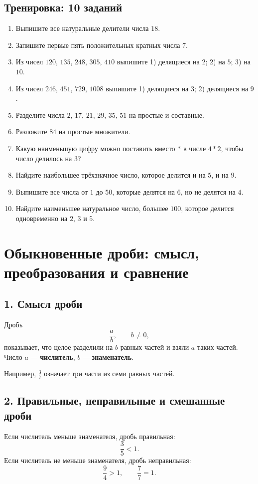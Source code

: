 \documentclass[12pt,a4paper]{article}
\newcommand{\term}[1]{\textbf{\textcolor{graphite}{#1}}}
\newcommand{\trainingtitle}{\subsection*{Тренировка: 10 заданий}}
\begin{document}
\trainingtitle
\begin{enumerate}
  \item Выпишите все натуральные делители числа $18$.
  \item Запишите первые пять положительных кратных числа $7$.
  \item Из чисел $120$, $135$, $248$, $305$, $410$ выпишите 1) делящиеся на $2$; 2) на $5$; 3) на $10$.
  \item Из чисел $246$, $451$, $729$, $1008$ выпишите 1) делящиеся на $3$; 2) делящиеся на $9$.
  \item Разделите числа $2$, $17$, $21$, $29$, $35$, $51$ на простые и составные.
  \item Разложите $84$ на простые множители.
  \item Какую наименьшую цифру можно поставить вместо $*$ в числе $4*2$, чтобы число делилось на $3$?
  \item Найдите наибольшее трёхзначное число, которое делится и на $5$, и на $9$.
  \item Выпишите все числа от $1$ до $50$, которые делятся на $6$, но не делятся на $4$.
  \item Найдите наименьшее натуральное число, большее $100$, которое делится одновременно на $2$, $3$ и $5$.
\end{enumerate}

\newpage

\section{Обыкновенные дроби: смысл, преобразования и сравнение}

\subsection*{1. Смысл дроби}
Дробь
\[
\frac{a}{b},\qquad b\ne0,
\]
показывает, что целое разделили на $b$ равных частей и взяли $a$ таких частей. Число $a$ --- \term{числитель}, $b$ --- \term{знаменатель}.

Например, $\frac{3}{7}$ означает три части из семи равных частей.

\subsection*{2. Правильные, неправильные и смешанные дроби}
Если числитель меньше знаменателя, дробь правильная:
\[
\frac35<1.
\]
Если числитель не меньше знаменателя, дробь неправильная:
\[
\frac94>1,\qquad \frac77=1.
\]
\end{document}
